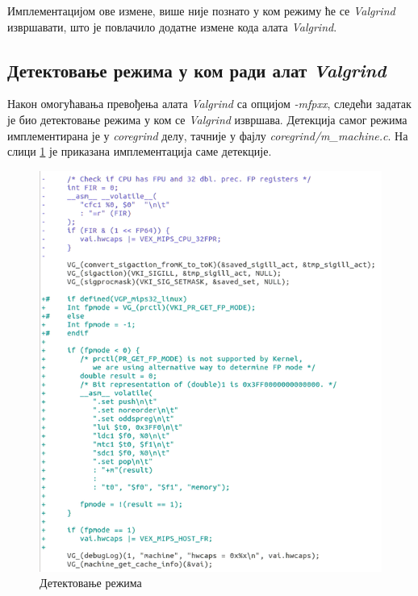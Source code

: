 \documentclass[12pt,oneside]{memoir}
\begin{document}
\indent Имплементацијом ове измене, више није познато у ком режиму ће се \textit{Valgrind} извршавати, што је повлачило додатне измене кода алата \textit{Valgrind}.

\subsection{Детектовање режима у ком ради алат \textit{Valgrind}}

\indent Након омогућавања превођења алата \textit{Valgrind} са опцијом \textit{-mfpxx}, следећи задатак је био детектовање режима у ком се \textit{Valgrind} извршава. Детекција самог режима имплементирана је у \textit{coregrind} делу, тачније у фајлу \textit{coregrind/m\_machine.c}. На слици \ref{fig:detekcija} је приказана имплементација саме детекције.

\begin{figure}[h!]
\begin{center}
\includegraphics[scale=0.75]{slika27.png}
\end{center}
\caption{Детектовање режима}
\label{fig:detekcija}
\end{figure}
\end{document}
